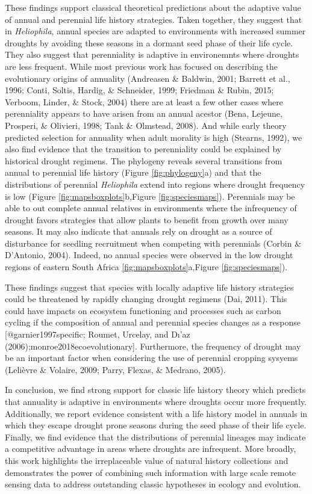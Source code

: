 \documentclass[man,floatsintext]{apa6}
\theoremstyle{definition}
\theoremstyle{definition}
\theoremstyle{definition}
\theoremstyle{remark}
\begin{document}
These findings support classical theoretical predictions about the
adaptive value of annual and perennial life history strategies. Taken
together, they suggest that in \emph{Heliophila}, annual species are
adapted to environments with increased summer droughts by avoiding these
seasons in a dormant seed phase of their life cycle. They also suggest
that perenniality is adaptive in environemnts where droughts are less
frequent. While most previous work has focused on describing the
evolutionary origins of annuality (Andreasen \& Baldwin, 2001; Barrett
et al., 1996; Conti, Soltis, Hardig, \& Schneider, 1999; Friedman \&
Rubin, 2015; Verboom, Linder, \& Stock, 2004) there are at least a few
other cases where perenniality appears to have arisen from an annual
acestor (Bena, Lejeune, Prosperi, \& Olivieri, 1998; Tank \& Olmstead,
2008). And while early theory predicted selection for annuality when
adult morality is high (Stearns, 1992), we also find evidence that the
transition to perenniality could be explained by historical drought
regimens. The phylogeny reveals several transitions from annual to
perennial life history (Figure \ref{fig:phylogeny}a) and that the
distributions of perennial \emph{Heliophila} extend into regions where
drought frequency is low (Figure \ref{fig:mapsboxplots}b,Figure
\ref{fig:speciesmaps}). Perennials may be able to out complete annual
relatives in environments where the infrequency of drought favors
strategies that allow plants to benefit from growth over many seasons.
It may also indicate that annuals rely on drought as a source of
disturbance for seedling recruitment when competing with perennials
(Corbin \& D'Antonio, 2004). Indeed, no annual species were observed in
the low drought regions of eastern South Africa
\ref{fig:mapsboxplots}a,Figure \ref{fig:speciesmaps}).

These findings suggest that species with locally adaptive life history
strategies could be threatened by rapidly changing drought regimens
(Dai, 2011). This could have impacts on ecosystem functioning and
processes such as carbon cycling if the composition of annual and
perennial species changes as a response {[}@garnier1997specific; Roumet,
Urcelay, and Dı'az (2006);monroe2018ecoevolutionary{]}. Furthermore, the
frequency of drought may be an important factor when considering the use
of perennial cropping sysyems (Lelièvre \& Volaire, 2009; Parry, Flexas,
\& Medrano, 2005).

In conclusion, we find strong support for classic life history theory
which predicts that annuality is adaptive in environments where droughts
occur more frequently. Additionally, we report evidence consistent with
a life history model in annuals in which they escape drought prone
seasons during the seed phase of their life cycle. Finally, we find
evidence that the distributions of perennial lineages may indicate a
competitive advantage in areas where droughts are infrequent. More
broadly, this work highlights the irreplaceable value of natural history
collections and demonstrates the power of combining such information
with large scale remote sensing data to address outstanding classic
hypotheses in ecology and evolution.
\end{document}
